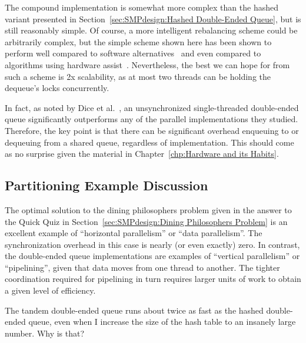 The compound implementation is somewhat more complex than the
hashed variant presented in
Section~\ref{sec:SMPdesign:Hashed Double-Ended Queue},
but is still reasonably simple.
Of course, a more intelligent rebalancing scheme could be arbitrarily
complex, but the simple scheme shown here has been shown to
perform well compared to software
alternatives~\cite{LukeDalessandro:2011:ASPLOS:HybridNOrecSTM:deque}
and even compared to algorithms using hardware
assist~\cite{DavidDice:2010:SCA:HTM:deque}.
Nevertheless, the best we can hope for from such a scheme
is 2x scalability, as at most two threads can be holding the
dequeue's locks concurrently.

In fact, as noted by Dice et al.~\cite{DavidDice:2010:SCA:HTM:deque},
an unsynchronized single-threaded double-ended queue significantly
outperforms any of the parallel implementations they studied.
Therefore, the key point is that there can be significant overhead enqueuing to
or dequeuing from a shared queue, regardless of implementation.
This should come as no surprise given the material in
Chapter~\ref{chp:Hardware and its Habits}.

\subsection{Partitioning Example Discussion}
\label{sec:SMPdesign:Partitioning Example Discussion}

The optimal solution to the dining philosophers problem given in
the answer to the Quick Quiz in
Section~\ref{sec:SMPdesign:Dining Philosophers Problem}
is an excellent example of ``horizontal parallelism'' or
``data parallelism''.
The synchronization overhead in this case is nearly (or even exactly)
zero.
In contrast, the double-ended
queue implementations are examples of ``vertical parallelism'' or
``pipelining'', given that data moves from one thread to another.
The tighter coordination required for pipelining in turn requires
larger units of work to obtain a given level of efficiency.

\QuickQuiz{}
	The tandem double-ended queue runs about twice as fast as
	the hashed double-ended queue, even when I increase the
	size of the hash table to an insanely large number.
	Why is that?
 \QuickQuizEnd

